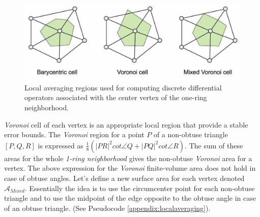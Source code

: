 \begin{figure}[!h]
    \centering
    \includegraphics[scale=0.35]{images/localregions.png}
    \caption{Local averaging regions used for computing discrete differential operators associated with the center vertex of the one-ring neighborhood. \cite{polygonmeshprocessing}} \label{fig:localregions}
\end{figure}
\textit{Voronoi} cell of each vertex is an appropriate local region that provide a stable error bounds.
The \textit{Voronoi} region for a point $P$ of a non-obtuse triangle $[P, Q, R]$ is expressed as $\frac{1}{8}(| PR|^2 cot \angle Q + |PQ |^2 cot \angle R)$. The sum of these areas for the whole \textit{1-ring neighborhood} gives the non-obtuse \textit{Voronoi} area for a vertex. The above expression for the \textit{Voronoi} finite-volume area does not hold in case of obtuse angles. Let's define a new surface area for each vertex denoted $\mathcal{A}_{Mixed}$. Essentially the idea is to use the circumcenter point for each non-obtuse triangle and to use the midpoint of the edge opposite to the obtuse angle in case of an obtuse triangle. (See Pseudocode \ref{appendix:localaveraging}). \cite{meshlab}


